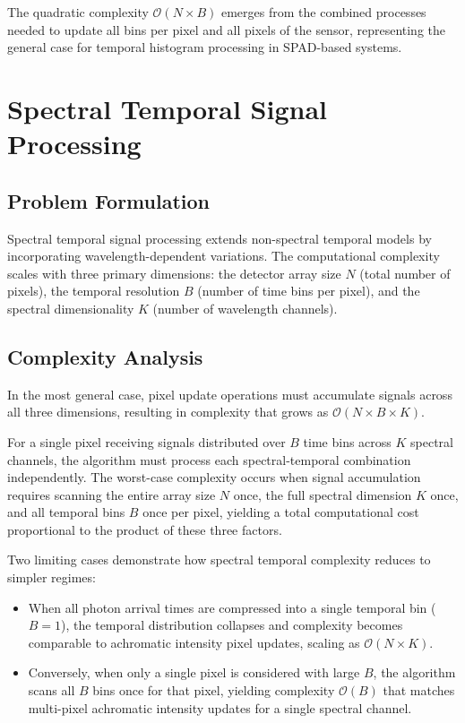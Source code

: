 \documentclass[10pt,twocolumn]{article}
\begin{document}
The quadratic complexity $\mathcal{O}(N \times B)$ emerges from the combined processes needed to update all bins per pixel and all pixels of the sensor, representing the general case for temporal histogram processing in SPAD-based systems.

\section{Spectral Temporal Signal Processing}

\subsection{Problem Formulation}

Spectral temporal signal processing extends non-spectral temporal models by incorporating wavelength-dependent variations. The computational complexity scales with three primary dimensions: the detector array size $N$ (total number of pixels), the temporal resolution $B$ (number of time bins per pixel), and the spectral dimensionality $K$ (number of wavelength channels).

\subsection{Complexity Analysis}

In the most general case, pixel update operations must accumulate signals across all three dimensions, resulting in complexity that grows as $\mathcal{O}(N \times B \times K)$.

For a single pixel receiving signals distributed over $B$ time bins across $K$ spectral channels, the algorithm must process each spectral-temporal combination independently. The worst-case complexity occurs when signal accumulation requires scanning the entire array size $N$ once, the full spectral dimension $K$ once, and all temporal bins $B$ once per pixel, yielding a total computational cost proportional to the product of these three factors.

Two limiting cases demonstrate how spectral temporal complexity reduces to simpler regimes:

\begin{itemize}
    \item When all photon arrival times are compressed into a single temporal bin ($B = 1$), the temporal distribution collapses and complexity becomes comparable to achromatic intensity pixel updates, scaling as $\mathcal{O}(N \times K)$.
    
    \item Conversely, when only a single pixel is considered with large $B$, the algorithm scans all $B$ bins once for that pixel, yielding complexity $\mathcal{O}(B)$ that matches multi-pixel achromatic intensity updates for a single spectral channel.
\end{itemize}
\end{document}
